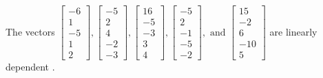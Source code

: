 \begin{exercise}
\begin{exerciseStatement}
  \end{exerciseStatement}
  \begin{exerciseAnswer}
   The vectors \(\left[\begin{array}{r}
-6 \\
1 \\
-5 \\
1 \\
2
\end{array}\right] , \left[\begin{array}{r}
-5 \\
2 \\
4 \\
-2 \\
-3
\end{array}\right] , \left[\begin{array}{r}
16 \\
-5 \\
-3 \\
3 \\
4
\end{array}\right] , \left[\begin{array}{r}
-5 \\
2 \\
-1 \\
-5 \\
-2
\end{array}\right] , \text{ and } \left[\begin{array}{r}
15 \\
-2 \\
6 \\
-10 \\
5
\end{array}\right]\) are 
  	 linearly dependent  .
  


  \end{exerciseAnswer}
\end{exercise}
